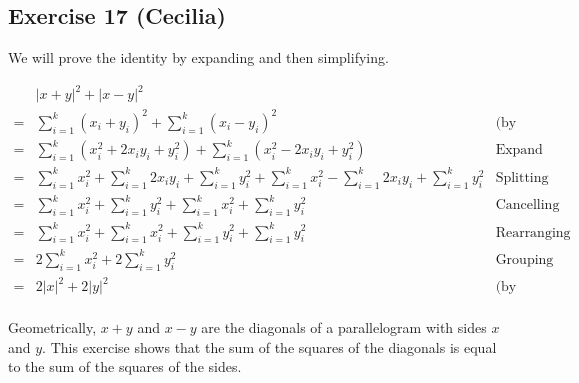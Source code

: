 \subsection*{Exercise 17 (Cecilia)}

We will prove the identity by expanding and then simplifying.

\begin{align*}
     & |x + y|^2 + |x - y|^2\\
    =& \sum\limits_{i=1}^{k} (x_i + y_i)^2 + \sum\limits_{i=1}^{k} (x_i - y_i)^2& \text{(by definition)} \\
    =& \sum\limits_{i=1}^{k} (x_i^2 + 2x_iy_i + y_i^2) + \sum\limits_{i=1}^{k} (x_i^2 - 2x_iy_i + y_i^2)& \text{Expand within sum} \\
    =& \sum\limits_{i=1}^{k} x_i^2 + \sum\limits_{i=1}^{k}2x_iy_i + \sum\limits_{i=1}^{k} y_i^2 + \sum\limits_{i=1}^{k} x_i^2 - \sum\limits_{i=1}^{k} 2x_iy_i + \sum\limits_{i=1}^{k}y_i^2& \text{Splitting the sums} \\
    =& \sum\limits_{i=1}^{k} x_i^2 + \sum\limits_{i=1}^{k} y_i^2 + \sum\limits_{i=1}^{k} x_i^2 + \sum\limits_{i=1}^{k}y_i^2& \text{Cancelling terms} \\
    =& \sum\limits_{i=1}^{k} x_i^2 + \sum\limits_{i=1}^{k} x_i^2 +\sum\limits_{i=1}^{k} y_i^2 + \sum\limits_{i=1}^{k}y_i^2& \text{Rearranging terms} \\
    =& 2\sum\limits_{i=1}^{k} x_i^2 + 2\sum\limits_{i=1}^{k}y_i^2& \text{Grouping terms} \\
    =& 2|x|^2 + 2|y|^2 & \text{(by definition)} \\
\end{align*}

Geometrically, $ x + y $ and $ x - y $ are the diagonals of a parallelogram with sides $ x $ and $ y $. This exercise shows that the sum of the squares of the diagonals is equal to the sum of the squares of the sides. 